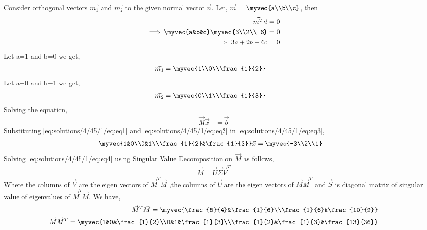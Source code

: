Consider orthogonal vectors $\vec{m_1}$ and $\vec{m_2}$ to the given normal vector $\vec{n}$. Let, $\vec{m}$ = $\myvec{a\\b\\c}$, then
\begin{align}
\vec{m^T}\vec{n} &= 0\\
\implies\myvec{a&b&c}\myvec{3\\2\\-6} &= 0\\
\implies3a+2b-6c &= 0
\end{align}
Let a=1 and b=0 we get,
\begin{align}
\vec{m_1} &= \myvec{1\\0\\\frac{1}{2}} \label{eq:solutions/4/45/1/eq:eq1}
\end{align}
Let a=0 and b=1 we get,
\begin{align}
\vec{m_2} &= \myvec{0\\1\\\frac{1}{3}} \label{eq:solutions/4/45/1/eq:eq2}
\end{align}
Solving the equation,
\begin{align}
\vec{M}\vec{x} &= \vec{b}\label{eq:solutions/4/45/1/eq:eq3}
\end{align}
Substituting \eqref{eq:solutions/4/45/1/eq:eq1} and \eqref{eq:solutions/4/45/1/eq:eq2} in \eqref{eq:solutions/4/45/1/eq:eq3},
\begin{align}
    \myvec{1&0\\0&1\\\frac{1}{2}&\frac{1}{3}}\vec{x} &= \myvec{-3\\2\\1}\label{eq:solutions/4/45/1/eq:eq4}
\end{align}
Solving \eqref{eq:solutions/4/45/1/eq:eq4} using Singular Value Decomposition on $\vec{M}$ as follows,
\begin{align}
\vec{M}=\vec{U}\vec{\Sigma}\vec{V}^T\label{eq:solutions/4/45/1/eq:eq5}
\end{align}
Where the columns of $\vec{V}$ are the eigen vectors of $\vec{M}^T\vec{M}$ ,the columns of $\vec{U}$ are the eigen vectors of $\vec{M}\vec{M}^T$ and $\vec{S}$ is diagonal matrix of singular value of eigenvalues of $\vec{M}^T\vec{M}$. We have,
\begin{align}
\vec{M}^T\vec{M}=\myvec{\frac{5}{4}&\frac{1}{6}\\\frac{1}{6}&\frac{10}{9}}\label{eq:solutions/4/45/1/eq:eq6}\\
\vec{M}\vec{M}^T=\myvec{1&0&\frac{1}{2}\\0&1&\frac{1}{3}\\\frac{1}{2}&\frac{1}{3}&\frac{13}{36}}
\end{align}

